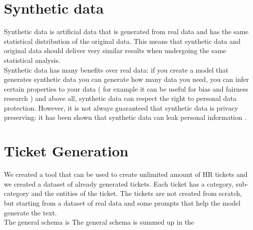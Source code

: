 \section{Synthetic data}
Synthetic data is artificial data that is generated from real data and has the same statistical distribution of the original data. This means that synthetic data and original data should deliver very similar results when undergoing the same statistical analysis. \\
Synthetic data has many benefits over real data: if you create a model that generates synthetic data you can generate how many data you need, you can infer certain properties to your data ( for example it can be useful for bias and fairness research ) and above all, synthetic data can respect the right to personal data protection. However, it is not always guaranteed that synthetic data is privacy preserving: it has been shown that synthetic data can leak personal information \cite{bellovin2019privacy}.\\

\section{Ticket Generation}
We created a tool that can be used to create unlimited amount of HR tickets and we created a dataset of already generated tickets. Each ticket has a category, sub-category and the entities of the ticket. The tickets are not created from scratch, but starting from a dataset of real data and some prompts that help the model generate the text. \\
The general schema is
The general schema is summed up in the 
